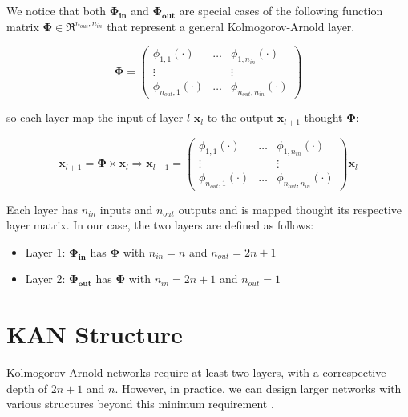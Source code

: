 \documentclass[12pt,a4paper]{article}
\begin{document}
We notice that both $\boldsymbol{\Phi_{in}}$ and $\boldsymbol{\Phi_{out}}$ are special cases of the following function matrix $\boldsymbol{\Phi} \in \Re^{n_{out},n_{in}}$ that represent a general Kolmogorov-Arnold layer. 

\[
\boldsymbol{\Phi} = 
\begin{pmatrix}
\phi_{1,1}(\cdot) & \dots & \phi_{1,n_{in}}(\cdot) \\
\vdots &   & \vdots \\
\phi_{n_{out},1}(\cdot) & \dots & \phi_{n_{out},n_{in}}(\cdot)
\end{pmatrix} 
\]

so each layer map the input of layer $l$ $\textbf{x}_l$ to the output $\textbf{x}_{l+1}$ thought $\boldsymbol{\Phi}$:

\[
\textbf{x}_{l+1} = \boldsymbol{\Phi} \times \textbf{x}_l \Rightarrow
\textbf{x}_{l+1} = 
\begin{pmatrix}
\phi_{1,1}(\cdot) & \dots & \phi_{1,n_{in}}(\cdot) \\
\vdots &   & \vdots \\
\phi_{n_{out},1}(\cdot) & \dots & \phi_{n_{out},n_{in}}(\cdot)
\end{pmatrix} \textbf{x}_l
\]


Each layer has $n_{in}$ inputs and $n_{out}$ outputs and is mapped thought its respective layer matrix. In our case, the two layers are defined as follows:
\begin{itemize}
    \item Layer 1: $\boldsymbol{\Phi_{in}}$ has $\boldsymbol{\Phi}$ with $n_{in} = n$ and $n_{out} = 2n+1$
    \item Layer 2: $\boldsymbol{\Phi_{out}}$ has $\boldsymbol{\Phi}$ with $n_{in} = 2n+1$ and $n_{out} = 1$
\end{itemize}

\section{KAN Structure}
Kolmogorov-Arnold networks require at least two layers, with a correspective depth of \(2n+1\) and \(n\). However, in practice, we can design larger networks with various structures beyond this minimum requirement \cite{KAN}.
\end{document}
